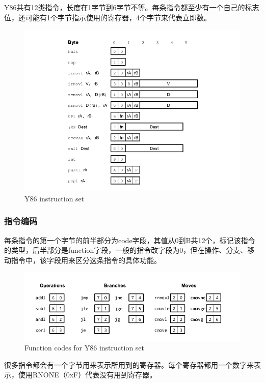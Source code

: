 \documentclass[12pt]{article}
\begin{document}
\begin{CJK*}{GB}{gbsn}
Y86共有12类指令，长度在1字节到6字节不等。每条指令都至少有一个自己的标志位，还可能有1个字节指示使用的寄存器，4个字节来代表立即数。

\begin{figure}[htbp]
\centering
\includegraphics{img/isa.png}
\caption{Y86 instruction set}
\end{figure}

\subsubsection{指令编码}\label{ux6307ux4ee4ux7f16ux7801}

每条指令的第一个字节的前半部分为code字段，其值从0到B共12个，标记该指令的类型，后半部分是function字段，一般的指令改字段为0，但在操作、分支、移动指令中，该字段用来区分这条指令的具体功能。

\begin{figure}[htbp]
\centering
\includegraphics{img/icodes.png}
\caption{Function codes for Y86 instruction set}
\end{figure}

很多指令都会有一个字节用来表示所用到的寄存器。每个寄存器都用一个数字来表示，使用RNONE（0xF）代表没有用到寄存器。


\end{CJK*}
\end{document}
